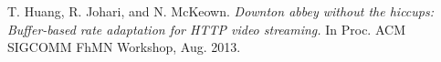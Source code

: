 \documentclass[9pt,a4paper]{acmproc}
\begin{document}
\begin{thebibliography}{9}
T. Huang, R. Johari, and N. McKeown.
	\emph{ Downton abbey without the hiccups: Buffer-based rate adaptation for HTTP video streaming.}
	\newline
	 In Proc. ACM SIGCOMM FhMN
Workshop, Aug. 2013.





\end{thebibliography}
\end{document}
